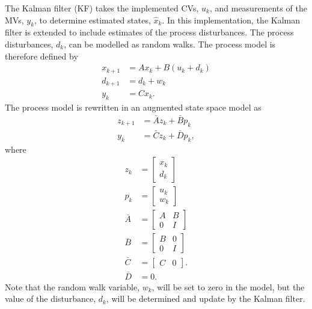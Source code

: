 \documentclass[12pt]{article}
\begin{document}
The Kalman filter (KF) takes the implemented CVs, $u_k$, and measurements of the MVs, $y_k$, to determine estimated states, $\hat{x}_k$. In this implementation, the Kalman filter is extended to include estimates of the process disturbances. The process disturbances, $d_k$, can be modelled as random walks. The process model is therefore defined by
\begin{subequations}
\begin{align}
x_{k+1} &= Ax_k + B(u_k+d_k) \\
d_{k+1} &= d_k + w_k \\
y_k &= Cx_k. 
\end{align} \label{eq:modelWithDisturbance}
\end{subequations}
The process model is rewritten in an augmented state space model as
\begin{subequations}
\begin{align}
z_{k+1} &= \bar{A}z_k + \bar{B}p_k \\
y_k &= \bar{C}z_k + \bar{D}p_k,
\end{align} \label{eq:augModel}
\end{subequations}
where
\begin{subequations}
\begin{align}
z_k &= \begin{bmatrix}
x_k \\ d_k
\end{bmatrix} \label{eq:augStates}\\
p_k &= \begin{bmatrix}
u_k \\ w_k
\end{bmatrix} \\
\bar{A} &= \begin{bmatrix}
A & B \\
0 & I
\end{bmatrix} \\
\bar{B} &= \begin{bmatrix}
B & 0 \\
0 & I
\end{bmatrix} \\
\bar{C} &= \begin{bmatrix}
C & 0
\end{bmatrix}. \\
\bar{D} &= 0.
\end{align} \label{eq:augModelParams}
\end{subequations}
Note that the random walk variable, $w_k$, will be set to zero in the model, but the value of the disturbance, $d_k$, will be determined and update by the Kalman filter.
\end{document}
